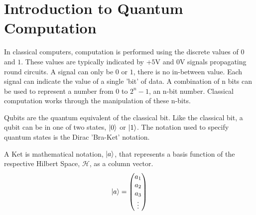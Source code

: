 \section{Introduction to Quantum Computation}
In classical computers, computation is performed using the discrete values of $0$ and $1$.
These values are typically indicated by +$5$V and $0$V signals propagating round circuits.
A signal can only be $0$ or $1$, there is no in-between value.
Each signal can indicate the value of a single 'bit' of data.
A combination of n bits can be used to represent a number from $0$ to $2^n-1$, an n-bit number.
Classical computation works through the manipulation of these n-bits.

Qubits are the quantum equivalent of the classical bit.
Like the classical bit, a qubit can be in one of two states, $\left\vert{0}\right\rangle$ or $\left\vert{1}\right\rangle$.
The notation used to specify quantum states is the Dirac\cite{dirac2004principles} 'Bra-Ket' notation.

A Ket is mathematical notation, $\left\vert{a}\right\rangle$, that represents a basis function of the respective Hilbert Space, $\mathcal{H}$, as a column vector.
\begin{equation}
\left\vert{a}\right\rangle = 
\begin{pmatrix}
a_1\\
a_2\\
a_3\\
\vdots
\end{pmatrix}
\end{equation}

